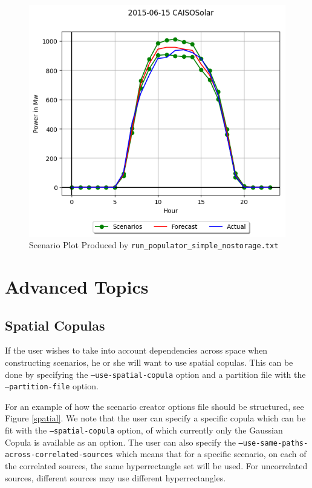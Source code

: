 \documentclass[11pt]{article}
\begin{document}
\begin{figure}[h]
	\includegraphics{CAISOSolar.png}
	\caption{Scenario Plot Produced by \texttt{run\_populator\_simple\_nostorage.txt}}
	\label{plots}
\end{figure}

\section{Advanced Topics}

\subsection{Spatial Copulas}
If the user wishes to take into account dependencies across space when constructing scenarios, he or she will want to use spatial copulas. This can be done by specifying the  \texttt{--use-spatial-copula} option and a partition file with the \texttt{--partition-file} option. 

For an example of how the scenario creator options file should be structured, see Figure \ref{spatial}. We note that the user can specify a specific copula which can be fit with the \texttt{--spatial-copula} option, of which currently only the Gaussian Copula is available as an option. The user can also specify the \texttt{--use-same-paths-across-correlated-sources} which means that for a specific scenario, on each of the correlated sources, the same hyperrectangle set will be used. For uncorrelated sources, different sources may use different hyperrectangles.
\end{document}
